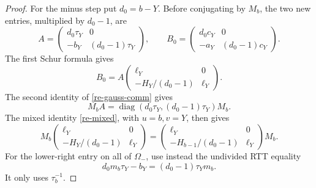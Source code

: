 \begin{proof}
For the minus step put \(d_0=b-Y\).
Before conjugating by \(M_b\), the two new entries, multiplied
by \(d_0-1\), are
\[
 A=\begin{pmatrix}d_0\tau_Y&0\\-b_Y&(d_0-1)\tau_Y\end{pmatrix},
 \qquad
 B_0=\begin{pmatrix}d_0c_Y&0\\-a_Y&(d_0-1)c_Y\end{pmatrix}.
\]
The first Schur formula gives
\begin{equation}
 B_0=A
       \begin{pmatrix}\ell_Y&0\\-H_Y/(d_0-1)&\ell_Y\end{pmatrix}.
                                                               \label{re-minus-block}
\end{equation}
The second identity of \eqref{re-gauss-comm} gives
\[
 M_b A=\operatorname{diag}(d_0\tau_Y,(d_0-1)\tau_Y)M_b.
\]
The mixed identity \eqref{re-mixed}, with \(u=b,v=Y\), then gives
\begin{equation}
 M_b
 \begin{pmatrix}\ell_Y&0\\-H_Y/(d_0-1)&\ell_Y\end{pmatrix}
 =
 \begin{pmatrix}\ell_Y&0\\-H_{b-1}/(d_0-1)&\ell_Y\end{pmatrix}M_b.
                                                               \label{re-minus-low-calc}
\end{equation}
For the lower-right entry on all of \(\Omega_-\), use instead
the undivided RTT equality
\begin{equation}
 d_0m_b\tau_Y-b_Y=(d_0-1)\tau_Ym_b.             \label{re-minus-all-reg}
\end{equation}
It only uses \(\tau_b^{-1}\).


\end{proof}
